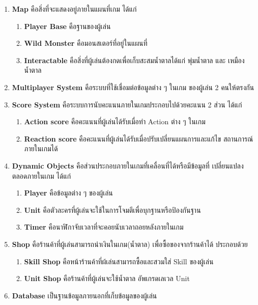 \documentclass[12pt,oneside,openright,a4paper]{cpe-thai-project}
\begin{document}
\begin{enumerate}
  \item \textbf{Map} คือสิ่งที่จะแสดงอยู่ภายในแผนที่เกม ได้แก่
  \begin{enumerate}
    \item \textbf{Player Base} คือฐานของผู้เล่น
    \item \textbf{Wild Monster} คือมอนสเตอร์ที่อยู่ในแผนที่
    \item \textbf{Interactable} คือสิ่งที่ผู้เล่นต้องกดเพื่อเก็บสะสมน้ำตาลได้แก่ พุ่มน้ำตาล และ เหมืองน้ำตาล
  \end{enumerate}

  \item \textbf{Multiplayer System} คือระบบที่ใช้เชื่อมต่อข้อมูลต่าง ๆ ในเกม
  ของผู้เล่น 2 คนให้ตรงกัน

  \item \textbf{Score System} คือระบบการนับคะแนนภายในเกมประกอบไปด้วยคะแนน 2 ส่วน ได้แก่
  \begin{enumerate}
    \item \textbf{Action score} คือคะแนนที่ผู้เล่นได้รับเมื่อทำ Action ต่าง ๆ ในเกม
    \item \textbf{Reaction score} คือคะแนนที่ผู้เล่นได้รับเมื่อปรับเปลี่ยนแผนการและแก้ไข
    สถานการณ์ภายในเกมได้
  \end{enumerate}

  \item \textbf{Dynamic Objects} คือส่วนประกอบภายในเกมที่เคลื่อนที่ได้หรือมีข้อมูลที่
  เปลี่ยนแปลงตลอดภายในเกม ได้แก่
  \begin{enumerate}
    \item \textbf{Player} คือข้อมูลต่าง ๆ ของผู้เล่น
    \item \textbf{Unit} คือตัวละครที่ผู้เล่นจะใช้ในการโจมตีเพื่อบุกฐานหรือป้องกันฐาน
    \item \textbf{Timer} คือนาฬิกาจับเวลาที่จะคอยนับเวลาถอยหลังภายในเกม
  \end{enumerate}
  
  \pagebreak
  \item \textbf{Shop} คือร้านค้าที่ผู้เล่นสามารถนำเงินในเกม(น้ำตาล) 
  เพื่อซื้อของจากร้านค้าได้ ประกอบด้วย
  \begin{enumerate}
    \item \textbf{Skill Shop} คือหน้าร้านค้าที่ผ้เล่นสามารถซื้อและสวมใส่ Skill ของผู้เล่น
    \item \textbf{Unit Shop} คือร้านค้าที่ผู้เล่นจะใช้น้ำตาล อัพเกรดเลเวล Unit 
  \end{enumerate}

  \item \textbf{Database} เป็นฐานข้อมูลภายนอกที่เก็บข้อมูลของผู้เล่น
\end{enumerate}
\end{document}
